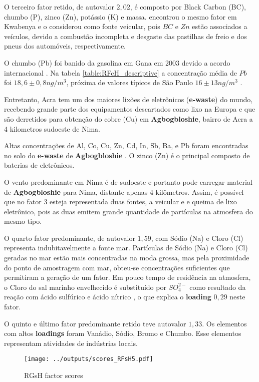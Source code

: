 O terceiro fator retido, de autovalor $2,02$, é composto por Black Carbon (BC), 
chumbo (P), zinco (Zn), potássio (K) e massa.
\cite{aboh2009} encontrou o mesmo fator em Kwabenya e o considerou como fonte
veicular, pois $BC$ e $Zn$ estão associados a veículos, devido a combustão 
incompleta e desgaste das pastilhas de freio e dos pneus dos automóveis, 
respectivamente.

O chumbo (Pb) foi banido da gasolina em Gana em 2003 devido a acordo 
internacional \citep{epa2015}.  
Na tabela \ref{table:RFcH_descriptive} a concentração média de $Pb$ 
foi $18,6 \pm 0,8 n g /m^3$, próxima de valores típicos de São Paulo 
$16 \pm 13 n g /m^3$ \citep{andrade2012}.

Entretanto, Acra tem um dos maiores lixões de eletrônicos (\textbf{e-waste}) 
do mundo, recebendo grande parte dos equipamentos descartados como lixo na 
Europa e que são derretidos para obtenção do cobre (Cu) em \textbf{Agbogbloshie},
bairro de Acra a 4 kilometros sudoeste de Nima.  

Altas concentrações de Al, Co, Cu, Zn, Cd, In, Sb, Ba, e Pb foram encontradas
no solo do \textbf{e-waste} de \textbf{Agbogbloshie} \citep{asante2012}. 
O zinco (Zn) é o principal composto de baterias de eletrônicos. 

O vento predominante em Nima é de sudoeste e portanto pode carregar material 
de \textbf{Agbogbloshie} para Nima, distante apenas 4 kilômetros. 
Assim, é possível que no fator 3 esteja representada duas fontes, a veicular e 
e queima de lixo eletrônico, pois as duas emitem grande quantidade de partículas
na atmosfera do mesmo tipo. 

O quarto fator predominante, de autovalor $1,59$, com Sódio (Na) e Cloro (Cl)
representa indubitavelmente a fonte mar. 
Partículas de Sódio (Na) e Cloro (Cl) geradas no mar estão mais concentradas 
na moda grossa, mas pela proximidade do ponto de amostragem com mar, obteu-se
concentrações suficientes que permitiram a geração de um fator. 
Em pouco tempo de residência na atmosfera, o Cloro do sal marinho envelhecido 
é substituído por $SO_4^{2-}$ como resultado da reação com ácido sulfúrico e 
ácido nítrico \citep{mcinnes1994}, o que explica o \textbf{loading} $0,29$ 
neste fator.

O quinto e último fator predominante retido teve autovalor $1,33$. 
Os elementos com altos \textbf{loadings} foram Vanádio, Sódio, Bromo e Chumbo.
Esse elementos representam atividades de indústrias locais. 

\begin{figure}[H]
  \centering
  \texttt{[image: ../outputs/scores\_RFsH5.pdf]}
  \caption{RGsH factor scores}
\end{figure}

